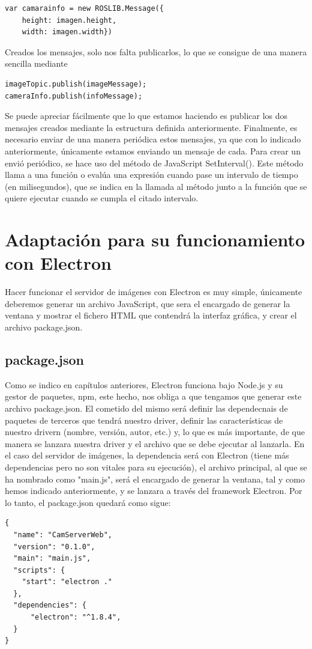 \begin{lstlisting}[frame=single]
var camarainfo = new ROSLIB.Message({
	height: imagen.height,
	width: imagen.width})

\end{lstlisting}
Creados los mensajes, solo nos falta publicarlos, lo que se consigue de una manera sencilla mediante
\begin{lstlisting}[frame=single]
imageTopic.publish(imageMessage);
cameraInfo.publish(infoMessage);
\end{lstlisting}
Se puede apreciar fácilmente que lo que estamos haciendo es publicar los dos mensajes creados mediante la estructura definida anteriormente. 
Finalmente, es necesario enviar de una manera periódica estos mensajes, ya que con lo indicado anteriormente, únicamente estamos enviando un mensaje de cada. Para crear un envió periódico, se hace uso del método de JavaScript SetInterval(). Este método llama a una función o evalúa una expresión cuando pase un intervalo de tiempo (en milisegundos), que se indica en la llamada al método junto a la función que se quiere ejecutar cuando se cumpla el citado intervalo.
\section{Adaptación para su funcionamiento con Electron}
Hacer funcionar el servidor de imágenes con Electron es muy simple, únicamente deberemos generar un archivo JavaScript, que sera el encargado de generar la ventana y mostrar el fichero HTML que contendrá la interfaz gráfica, y crear el archivo package.json.
\subsection{package.json}
Como se indico en capítulos anteriores, Electron funciona bajo Node.js y su gestor de paquetes, npm, este hecho, nos obliga a que tengamos que generar este archivo package.json. El cometido del mismo será definir las dependecnais de paquetes de terceros que tendrá nuestro driver, definir las características de nuestro drivern (nombre, versión, autor, etc.) y, lo que es más importante, de que manera se lanzara nuestra driver y el archivo que se debe ejecutar al lanzarla. En el caso del servidor de imágenes, la dependencia será con Electron (tiene más dependencias pero no son vitales para su ejecución), el archivo principal, al que se ha nombrado como "main.js", será el encargado de generar la ventana, tal y como hemos indicado anteriormente, y se lanzara a través del framework Electron. Por lo tanto, el package.json quedará como sigue:
\begin{lstlisting}[frame=single]
{
  "name": "CamServerWeb",
  "version": "0.1.0",
  "main": "main.js",
  "scripts": {
    "start": "electron ."
  },
  "dependencies": {
      "electron": "^1.8.4",
  }
}
\end{lstlisting}
